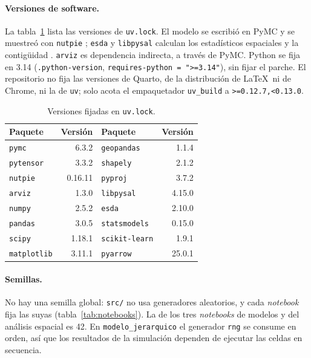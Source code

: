 \paragraph{Versiones de software.} La tabla~\ref{tab:versiones} lista las
versiones de \texttt{uv.lock}. El modelo se escribió en PyMC
\parencite{abrilpla2023pymc} y se muestreó con \texttt{nutpie} \parencite{seyboldt_nutpie}; \texttt{esda} y
\texttt{libpysal} calculan los estadísticos espaciales y la contigüidad
\parencite{rey2007pysal,rey2022pysal}.
\texttt{arviz} es dependencia indirecta, a través de PyMC. Python se fija en 3.14
(\texttt{.python-version}, \texttt{requires-python = ">=3.14"}), sin fijar el
parche. El repositorio no fija las versiones de Quarto, de la distribución de
\LaTeX\ ni de Chrome, ni la de \texttt{uv}; solo acota el empaquetador
\texttt{uv\_build} a \texttt{>=0.12.7,<0.13.0}.

\begin{table}
	\centering\small
	\caption{Versiones fijadas en \texttt{uv.lock}.}
	\label{tab:versiones}
	\begin{tabular}{@{}lrlr@{}}
		\toprule
		Paquete             & Versión & Paquete               & Versión \\
		\midrule
		\texttt{pymc}       & 6.3.2   & \texttt{geopandas}    & 1.1.4   \\
		\texttt{pytensor}   & 3.3.2   & \texttt{shapely}      & 2.1.2   \\
		\texttt{nutpie}     & 0.16.11 & \texttt{pyproj}       & 3.7.2   \\
		\texttt{arviz}      & 1.3.0   & \texttt{libpysal}     & 4.15.0  \\
		\texttt{numpy}      & 2.5.2   & \texttt{esda}         & 2.10.0  \\
		\texttt{pandas}     & 3.0.5   & \texttt{statsmodels}  & 0.15.0  \\
		\texttt{scipy}      & 1.18.1  & \texttt{scikit-learn} & 1.9.1   \\
		\texttt{matplotlib} & 3.11.1  & \texttt{pyarrow}      & 25.0.1  \\
		\bottomrule
	\end{tabular}
\end{table}

\paragraph{Semillas.} No hay una semilla global: \texttt{src/} no usa generadores
aleatorios, y cada \emph{notebook} fija las suyas (tabla~\ref{tab:notebooks}). La
de los tres \emph{notebooks} de modelos y del análisis espacial es 42. En
\texttt{modelo\_jerarquico} el generador \texttt{rng} se consume en orden, así que
los resultados de la simulación dependen de ejecutar las celdas en secuencia.


